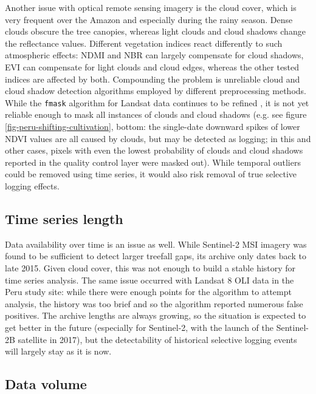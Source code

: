 \documentclass[a4paper,12pt]{scrbook}
\begin{document}
Another issue with optical remote sensing imagery is the cloud cover, which is very frequent over the Amazon and especially during the rainy season. Dense clouds obscure the tree canopies, whereas light clouds and cloud shadows change the reflectance values. Different vegetation indices react differently to such atmospheric effects: \ac{NDMI} and \ac{NBR} can largely compensate for cloud shadows, \ac{EVI} can compensate for light clouds and cloud edges, whereas the other tested indices are affected by both. Compounding the problem is unreliable cloud and cloud shadow detection algorithms employed by different preprocessing methods. While the \texttt{fmask} algorithm for Landsat data continues to be refined \citep{zhu_improvement_2015, qiu_improving_2017}, it is not yet reliable enough to mask all instances of clouds and cloud shadows (e.g. see figure \ref{fig-peru-shifting-cultivation}, bottom: the single-date downward spikes of lower \ac{NDVI} values are all caused by clouds, but may be detected as logging; in this and other cases, pixels with even the lowest probability of clouds and cloud shadows reported in the quality control layer were masked out). While temporal outliers could be removed using time series, it would also risk removal of true selective logging effects.

\subsection{Time series length}

Data availability over time is an issue as well. While Sentinel-2 \ac{MSI} imagery was found to be sufficient to detect larger treefall gaps, its archive only dates back to late 2015. Given cloud cover, this was not enough to build a stable history for time series analysis. The same issue occurred with Landsat 8 \ac{OLI} data in the Peru study site: while there were enough points for the algorithm to attempt analysis, the history was too brief and so the algorithm reported numerous false positives. The archive lengths are always growing, so the situation is expected to get better in the future (especially for Sentinel-2, with the launch of the Sentinel-2B satellite in 2017), but the detectability of historical selective logging events will largely stay as it is now.

\subsection{Data volume}
\end{document}
